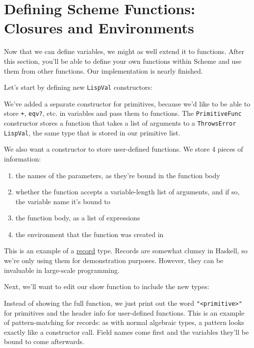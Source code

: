 \chapter[Defining Scheme Functions]{Defining Scheme Functions: Closures and Environments}
 
 
Now that we can define variables, we might as well extend it to functions. After this section, you'll be able to define your own functions within Scheme and use them from other functions. Our implementation is nearly finished.
 
Let's start by defining new \verb|LispVal| constructors:
 
 
We've added a separate constructor for primitives, because we'd like to be able to store \lstinline|+|, \verb|eqv?|, etc. in variables and pass them to functions. The \verb|PrimitiveFunc| constructor stores a function that takes a list of arguments to a \verb|ThrowsError LispVal|, the same type that is stored in our primitive list.
 
We also want a constructor to store user-defined functions. We store 4 pieces of information:
 
\begin{enumerate}
	\item the names of the parameters, as they're bound in the function body
	\item whether the function accepts a variable-length list of arguments, and if so, the variable name it's bound to
	\item the function body, as a list of expressions
	\item the environment that the function was created in
\end{enumerate}
 
This is an example of a \href{http://www.haskell.org/hawiki/UsingRecords}{record} type. Records are somewhat clumsy in Haskell, so we're only using them for demonstration purposes. However, they can be invaluable in large-scale programming.
 
Next, we'll want to edit our show function to include the new types:
 
 
Instead of showing the full function, we just print out the word \lstinline|"<primitive>"| for primitives and the header info for user-defined functions. This is an example of pattern-matching for records: as with normal algebraic types, a pattern looks exactly like a constructor call. Field names come first and the variables they'll be bound to come afterwards.
 
